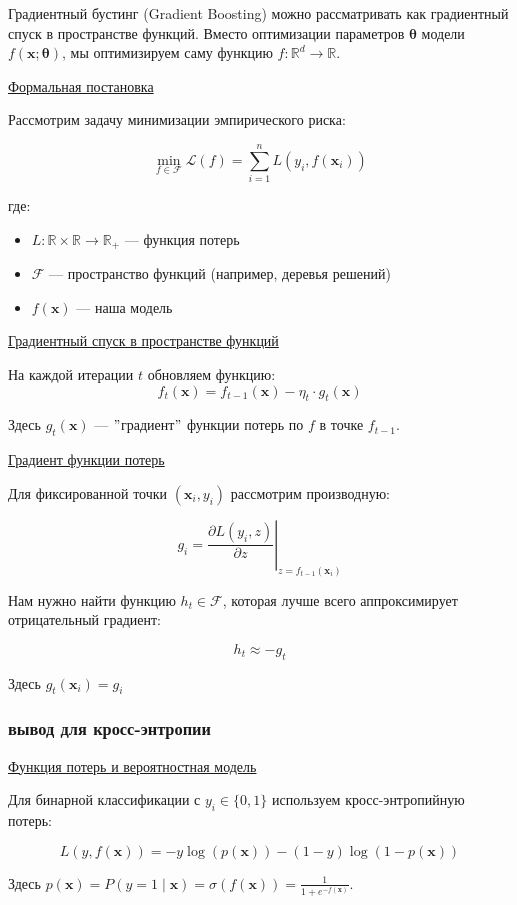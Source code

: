 Градиентный бустинг (Gradient Boosting) можно рассматривать как градиентный спуск в пространстве функций.
Вместо оптимизации параметров $\bm{\theta}$ модели $f(\bm{x}; \bm{\theta})$, мы оптимизируем саму функцию
$f: \mathbb{R}^d \to \mathbb{R}$.

\underline{Формальная постановка}

Рассмотрим задачу минимизации эмпирического риска:

\[ \min_{f \in \mathcal{F}} \mathcal{L}(f) = \sum_{i=1}^n L(y_i, f(\bm{x}_i)) \]

где:
\begin{itemize}
    \item $L: \mathbb{R} \times \mathbb{R} \to \mathbb{R}_+$ --- функция потерь
    \item $\mathcal{F}$ --- пространство функций (например, деревья решений)
    \item $f(\bm{x})$ --- наша модель
\end{itemize}

\underline{Градиентный спуск в пространстве функций}

На каждой итерации $t$ обновляем функцию:
\[ f_t(\bm{x}) = f_{t-1}(\bm{x}) - \eta_t \cdot g_t(\bm{x}) \]

Здесь $g_t(\bm{x})$ --- \("\)градиент\("\) функции потерь по $f$ в точке $f_{t-1}$.

\underline{Градиент функции потерь}

Для фиксированной точки $(\bm{x}_i, y_i)$ рассмотрим производную:

\[ g_i = \left. \frac{\partial L(y_i, z)}{\partial z} \right|_{z = f_{t-1}(\bm{x}_i)} \]

Нам нужно найти функцию $h_t \in \mathcal{F}$, которая лучше всего аппроксимирует отрицательный градиент:

\[ h_t \approx -g_t \]

Здесь $g_t(\bm{x}_i) = g_i$

\subsubsection{вывод для кросс-энтропии}

\underline{Функция потерь и вероятностная модель}

Для бинарной классификации с $y_i \in \{0, 1\}$ используем кросс-энтропийную потерь:

\[ L(y, f(\bm{x})) = -y \log(p(\bm{x})) - (1-y) \log(1 - p(\bm{x})) \]

Здесь $p(\bm{x}) = P(y=1 \mid \bm{x}) = \sigma(f(\bm{x})) = \frac{1}{1 + e^{-f(\bm{x})}}$.

